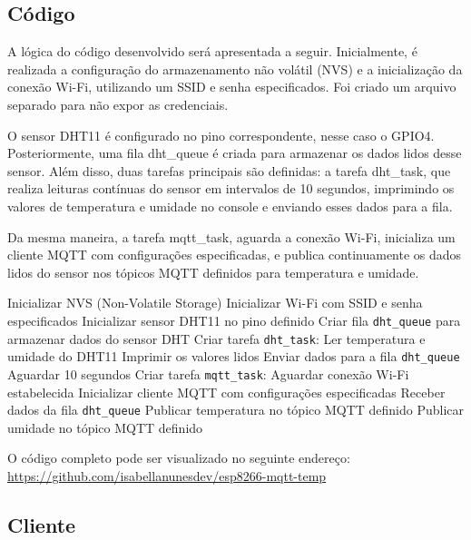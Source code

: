 \documentclass[12pt]{article}
\begin{document}
\subsection{Código}

A lógica do código desenvolvido será apresentada a seguir. Inicialmente, é realizada a configuração do armazenamento não volátil (NVS) e a inicialização da conexão Wi-Fi, utilizando um SSID e senha especificados. Foi criado um arquivo separado para não expor as credenciais.

O sensor DHT11 é configurado no pino correspondente, nesse caso o GPIO4. Posteriormente, uma fila dht\_queue é criada para armazenar os dados lidos desse sensor. Além disso, duas tarefas principais são definidas: a tarefa dht\_task, que realiza leituras contínuas do sensor em intervalos de 10 segundos, imprimindo os valores de temperatura e umidade no console e enviando esses dados para a fila.

Da mesma maneira, a tarefa mqtt\_task, aguarda a conexão Wi-Fi, inicializa um cliente MQTT com configurações especificadas, e publica continuamente os dados lidos do sensor nos tópicos MQTT definidos para temperatura e umidade. 

\begin{algorithm}
  \caption{}
  \begin{algorithmic}[1]
  \STATE Inicializar NVS (Non-Volatile Storage)
  \STATE Inicializar Wi-Fi com SSID e senha especificados
  \STATE Inicializar sensor DHT11 no pino definido
  \STATE Criar fila \texttt{dht\_queue} para armazenar dados do sensor DHT
  \STATE Criar tarefa \texttt{dht\_task}:
          \STATE Ler temperatura e umidade do DHT11
          \STATE Imprimir os valores lidos
          \STATE Enviar dados para a fila \texttt{dht\_queue}
          \STATE Aguardar 10 segundos
      \ENDWHILE
  \STATE Criar tarefa \texttt{mqtt\_task}:
      \STATE Aguardar conexão Wi-Fi estabelecida
      \STATE Inicializar cliente MQTT com configurações especificadas
          \STATE Receber dados da fila \texttt{dht\_queue}
          \STATE Publicar temperatura no tópico MQTT definido
          \STATE Publicar umidade no tópico MQTT definido
      \ENDWHILE
  \end{algorithmic}
\end{algorithm}

O código completo pode ser visualizado no seguinte endereço: \url{https://github.com/isabellanunesdev/esp8266-mqtt-temp}

\subsection{Cliente}
\end{document}
